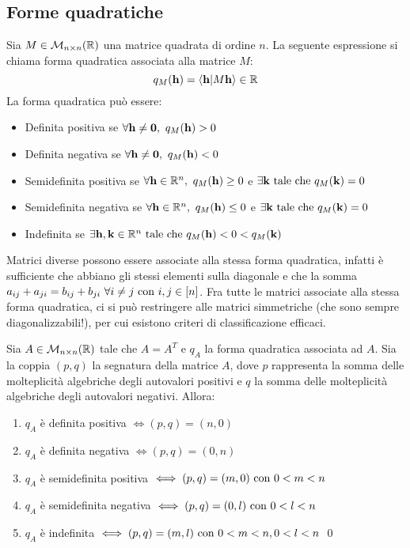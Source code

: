 \subsection{Forme quadratiche}

Sia $M \in \mathcal{M}_{n \times n}(\mathbb{R})$ una matrice quadrata di ordine $n$. La seguente espressione si chiama forma quadratica associata alla matrice $M$:
$$
    q_M(\vb{h}) = \ip{\vb{h}}{M\vb{h}} \in \R
$$
La forma quadratica può essere:
\begin{itemize}
    \item Definita positiva se $\forall \vb{h}\neq \vb{0}, \ q_M(\vb{h})> 0$
    \item Definita negativa se $\forall \vb{h}\neq \vb{0}, \ q_M(\vb{h}) < 0$
    \item Semidefinita positiva se $\forall \vb{h}\in \mathbb{R}^n, \ q_M(\vb{h}) \geq 0$ e $\exists \vb{k} \text{ tale che } q_M(\vb{k})=0$
    \item Semidefinita negativa se $\forall \vb{h}\in \mathbb{R}^n, \ q_M(\vb{h}) \leq 0$ e $\exists \vb{k} \text{ tale che } q_M(\vb{k})=0$
    \item Indefinita se $\exists \vb{h}, \vb{k} \in \mathbb{R}^n \text{ tale che } q_M(\vb{h}) < 0 < q_M(\vb{k})$
\end{itemize}

Matrici diverse possono essere associate alla stessa forma quadratica, infatti è sufficiente che abbiano gli stessi elementi sulla diagonale e che la somma $a_{ij}+a_{ji}=b_{ij}+b_{ji} \ \forall i\neq j\text{ con } i,j \in [n]$. Fra tutte le matrici associate alla stessa forma quadratica, ci si può restringere alle matrici simmetriche (che sono sempre diagonalizzabili!), per cui esistono criteri di classificazione efficaci.

\begin{theorem}
    Sia $A \in \mathcal{M}_{n\times n}(\mathbb{R})$ tale che $A=A^T$ e $q_A$ la forma quadratica associata ad $A$. Sia la coppia $(p,q)$ la segnatura della matrice $A$, dove $p$ rappresenta la somma delle molteplicità algebriche degli autovalori positivi e $q$ la somma delle molteplicità algebriche degli autovalori negativi. Allora:
    \begin{enumerate}
        \item $q_A$ è definita positiva $\iff (p,q)=(n,0)$
        \item $q_A$ è definita negativa $\iff (p,q)=(0,n)$
        \item $q_A$ è semidefinita positiva $\iff (p,q)=(m,0) \text{ con } 0< m < n$
        \item $q_A$ è semidefinita negativa $\iff (p,q)=(0,l) \text{ con } 0< l < n$
        \item $q_A$ è indefinita $\iff (p,q)=(m,l) \text{ con } 0<m<n,0<l<n$
        \qed
    \end{enumerate}
\end{theorem}

